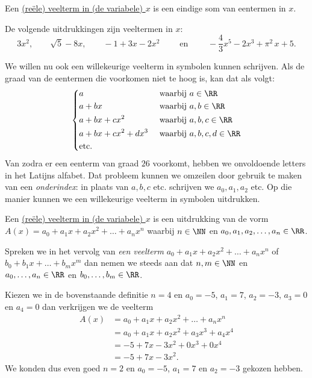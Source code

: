 \documentclass{ximera}
\begin{document}
\begin{definition}[in woorden]
Een \underline{(re\"ele) veelterm in (de variabele) $x$} is een eindige som van eentermen in $x$.
\end{definition}

\begin{example}
De volgende uitdrukkingen zijn veeltermen in $x$:
\[
3x^2, \qquad \sqrt{5} - 8x, \qquad -1 + 3x -2x^2 \qquad \text{ en } \qquad -\frac{4}{3}x^5 - 2x^3 + \pi^2\,x + 5. 
\]
\end{example}

We willen nu ook een willekeurige veelterm in symbolen kunnen schrijven. Als de graad van de eentermen die voorkomen niet te hoog is, kan dat als volgt:
\begin{align*} 
\left\{
\begin{aligned}
& a && \text{ waarbij } a \in \RR  \\
& a + bx && \text{ waarbij } a,b \in \RR  \\
& a + bx + cx^2 && \text{ waarbij } a,b,c \in \RR  \\
& a + bx + cx^2 + dx^3 && \text{ waarbij } a,b,c,d \in \RR \\
& \text{etc.} && 
\end{aligned}
\right.
\end{align*}
Van zodra er een eenterm van graad $26$ voorkomt, hebben we onvoldoende letters in het Latijns alfabet. Dat probleem kunnen we omzeilen door gebruik te maken van een {\em onderindex}\:: in plaats van $a,b,c$ etc. schrijven we $a_0, a_1, a_2$ etc. Op die manier kunnen we een willekeurige veelterm in symbolen uitdrukken.

\begin{definition}[in symbolen]
Een \underline{(re\"ele) veelterm in (de variabele) $x$} is een uitdrukking van de vorm $A(x) = a_0 + a_1x + a_2x^2 + \dots + a_n x^n$ waarbij $n \in \NN$ en $a_0,a_1,a_2,\ldots,a_n \in \RR$.
\end{definition}

Spreken we in het vervolg van {\em een veelterm} $a_0 + a_1x + a_2x^2 + \dots + a_n x^n$ of $b_0 + b_1x + \dots + b_m x^m$ dan nemen we steeds aan dat $n,m\in \NN$ en $a_0, \ldots, a_n\in \RR$ en $b_0, \ldots, b_m\in \RR$.

\begin{example}
Kiezen we in de bovenstaande definitie $n = 4$ en $a_0 = -5$, $a_1 = 7$, $a_2 = -3$, $a_3 = 0$ en $a_4 = 0$ dan verkrijgen we de veelterm
\begin{align*}
A(x) 
& = a_0 + a_1x + a_2x^2 + \dots + a_n x^n \\
& = a_0 + a_1x + a_2x^2 + a_3 x^3 + a_4 x^4 \\ 
& = -5 + 7x - 3x^2 + 0x^3 + 0x^4 \\
& = -5 + 7x - 3x^2.
\end{align*}
We konden dus even goed $n = 2$ en $a_0 = -5$, $a_1 = 7$ en $a_2 = -3$ gekozen hebben. 
\end{example}
\end{document}

